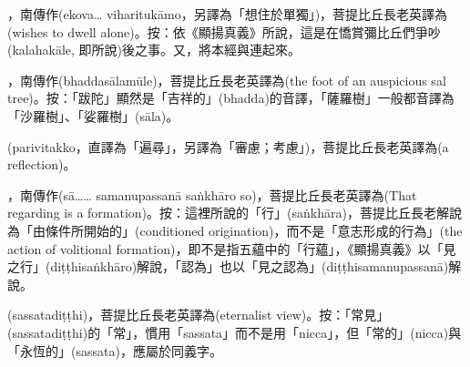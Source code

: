 \startitemgroup[noteitems]
\item{}，南傳作(ekova… viharitukāmo，另譯為「想住於單獨」)，菩提比丘長老英譯為(wishes to dwell alone)。按：依《顯揚真義》所說，這是在憍賞彌比丘們爭吵(kalahakāle, 即所說)後之事。又，將本經與連起來。
\stopitemgroup

\startitemgroup[noteitems]
\item{}，南傳作(bhaddasālamūle)，菩提比丘長老英譯為(the foot of an auspicious sal tree)。按：「跋陀」顯然是「吉祥的」(bhadda)的音譯，「薩羅樹」一般都音譯為「沙羅樹」、「娑羅樹」(sāla)。
\stopitemgroup

\startitemgroup[noteitems]
\item{}(parivitakko，直譯為「遍尋」，另譯為「審慮；考慮」)，菩提比丘長老英譯為(a reflection)。
\stopitemgroup

\startitemgroup[noteitems]
\item{}，南傳作(sā…… samanupassanā saṅkhāro so)，菩提比丘長老英譯為(That regarding is a formation)。按：這裡所說的「行」(saṅkhāra)，菩提比丘長老解說為「由條件所開始的」(conditioned origination)，而不是「意志形成的行為」(the action of volitional formation)，即不是指五蘊中的「行蘊」，《顯揚真義》以「見之行」(diṭṭhisaṅkhāro)解說，「認為」也以「見之認為」(diṭṭhisamanupassanā)解說。
\stopitemgroup

\startitemgroup[noteitems]
\item{}(sassatadiṭṭhi)，菩提比丘長老英譯為(eternalist view)。按：「常見」(sassatadiṭṭhi)的「常」，慣用「sassata」而不是用「nicca」，但「常的」(nicca)與「永恆的」(sassata)，應屬於同義字。
\stopitemgroup

